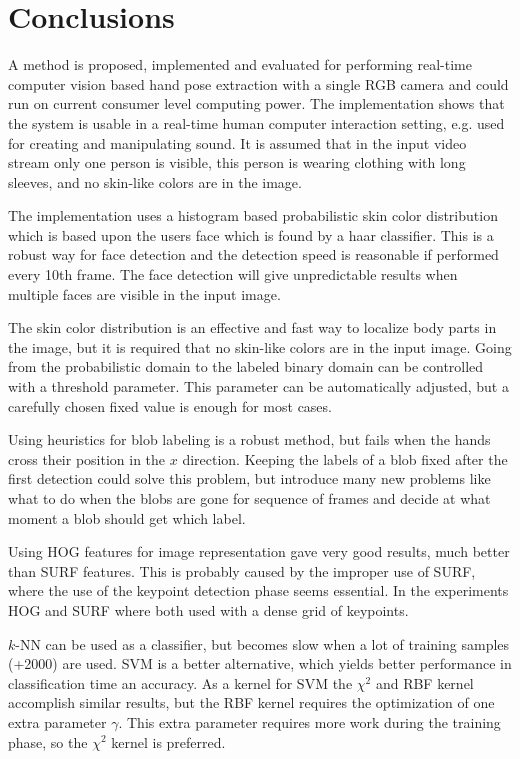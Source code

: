 
\chapter{Conclusions}
\label{ch:conc}
A method is proposed, implemented and evaluated for performing real-time computer vision based hand pose extraction with a single RGB camera and could run on current consumer level computing power. The implementation shows that the system is usable in a real-time human computer interaction setting, e.g. used for creating and manipulating sound. It is assumed that in the input video stream only one person is visible, this person is wearing clothing with long sleeves, and no skin-like colors are in the image.

The implementation uses a histogram based probabilistic skin color distribution which is based upon the users face which is found by a haar classifier. This is a robust way for face detection and the detection speed is reasonable if performed every 10th frame. The face detection will give unpredictable results when multiple faces are visible in the input image.

The skin color distribution is an effective and fast way to localize body parts in the image, but it is required that no skin-like colors are in the input image. Going from the probabilistic domain to the labeled binary domain can be controlled with a threshold parameter.  This parameter can be automatically adjusted, but a carefully chosen fixed value is enough for most cases. 

Using heuristics for blob labeling is a robust method, but fails when the hands cross their position in the $x$ direction. Keeping the labels of a blob fixed after the first detection could solve this problem, but introduce many new problems like what to do when the blobs are gone for sequence of frames and decide at what moment a blob should get which label.

Using HOG features for image representation gave very good results, much better than SURF features. This is probably caused by the improper use of SURF, where the use of the keypoint detection phase seems essential. In the experiments HOG and SURF where both used with a dense grid of keypoints.

$k$-NN can be used as a classifier, but becomes slow when a lot of training samples (+2000) are used. SVM is a better alternative, which yields better performance in classification time an accuracy. As a kernel for SVM the $\chi^2$ and RBF kernel accomplish similar results, but the RBF kernel requires the optimization of one extra parameter $\gamma$. This extra parameter requires more work during the training phase, so the $\chi^2$ kernel is preferred.

